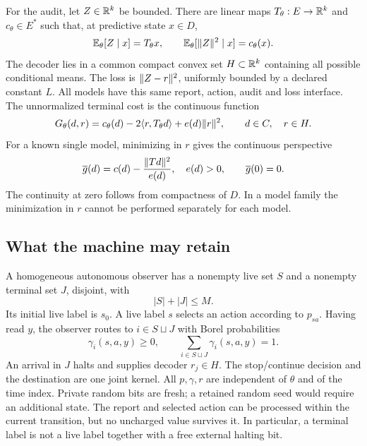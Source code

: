 For the audit, let $Z\in\mathbb R^k$ be bounded. There are linear maps $T_\theta:E\to\mathbb R^k$ and $c_\theta\in E^*$ such that, at predictive state $x\in D$,
\begin{equation}\label{eq:audit}
 \mathbb E_\theta[Z\mid x]=T_\theta x,\qquad
 \mathbb E_\theta[\lVert Z\rVert^2\mid x]=c_\theta(x).
\end{equation}
The decoder lies in a common compact convex set $H\subset\mathbb R^k$ containing all possible conditional means. The loss is $\lVert Z-r\rVert^2$, uniformly bounded by a declared constant $L$. All models have this same report, action, audit and loss interface. The unnormalized terminal cost is the continuous function
\begin{equation}\label{eq:terminal-cost}
 G_\theta(d,r)=c_\theta(d)-2\langle r,T_\theta d\rangle+e(d)\lVert r\rVert^2,
 \qquad d\in C,\quad r\in H.
\end{equation}
For a known single model, minimizing in $r$ gives the continuous perspective
\begin{equation}\label{eq:perspective}
 \overline g(d)=c(d)-\frac{\lVert Td\rVert^2}{e(d)},\quad e(d)>0,
 \qquad \overline g(0)=0.
\end{equation}
The continuity at zero follows from compactness of $D$. In a model family the minimization in $r$ cannot be performed separately for each model.

\subsection{What the machine may retain}
A homogeneous autonomous observer has a nonempty live set $S$ and a nonempty terminal set $J$, disjoint, with
\begin{equation}\label{eq:state-budget}
 |S|+|J|\le M.
\end{equation}
Its initial live label is $s_0$. A live label $s$ selects an action according to $p_{sa}$. Having read $y$, the observer routes to $i\in S\sqcup J$ with Borel probabilities
\begin{equation}\label{eq:routing}
 \gamma_i(s,a,y)\ge0,\qquad \sum_{i\in S\sqcup J}\gamma_i(s,a,y)=1.
\end{equation}
An arrival in $J$ halts and supplies decoder $r_j\in H$. The stop/continue decision and the destination are one joint kernel. All $p,\gamma,r$ are independent of $\theta$ and of the time index. Private random bits are fresh; a retained random seed would require an additional state. The report and selected action can be processed within the current transition, but no uncharged value survives it. In particular, a terminal label is not a live label together with a free external halting bit.


